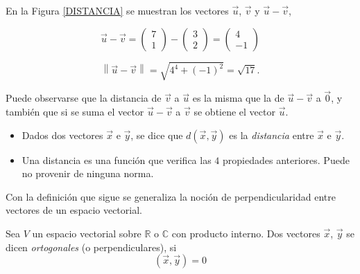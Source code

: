 \begin{example}
    

En la Figura \ref{DISTANCIA} se muestran los vectores $\vec{u}$, $\vec{v}$ y $\vec{u}- \vec{v}$,

$$ \vec{u}- \vec{v}= \left(\begin{array}{c}  7  \\ 1
\end{array}
 \right)-   \left(\begin{array}{c}  3  \\ 2 
\end{array}
 \right) =   \left(\begin{array}{c}  4  \\ -1
\end{array}
 \right)$$ 

$$\left\|\vec{u}-\vec{v}\right\|= \sqrt{ 4^4+ (-1)^2}=\sqrt{17}.$$

Puede observarse que la distancia de $\vec{v}$ a $\vec{u}$ es la misma que la de $\vec{u}- \vec{v}$ a $\vec{0}$, y también que si se suma el vector $\vec{u}- \vec{v}$ a $\vec{v}$ se obtiene el vector $\vec{u}$.
\end{example} 

\begin{remark}
\begin{itemize}
    \item 

     Dados dos vectores   $\vec{x}$ e $\vec{y}$, se dice que $d(\vec{x},\vec{y})$ es la \textit{distancia} entre $\vec{x}$ e $\vec{y}$.
     \item 

     Una distancia es una función  que verifica las $4$ propiedades anteriores. Puede no provenir de ninguna norma.
\end{itemize}
\end{remark}






\bigskip

Con la definición que sigue se  generaliza  la noción de perpendicularidad entre vectores de un espacio vectorial. 

\bigskip
\begin{definition}

Sea $V$ un espacio vectorial sobre $\mathbb{R}$ o $\mathbb{C}$ con producto interno. Dos vectores $\vec{x}$, $\vec{y}$ se dicen \textit{ortogonales} (o perpendiculares), si
\begin{equation}
(\vec{x},\vec{y})=0
\label{40}
\end{equation}

\end{definition}

